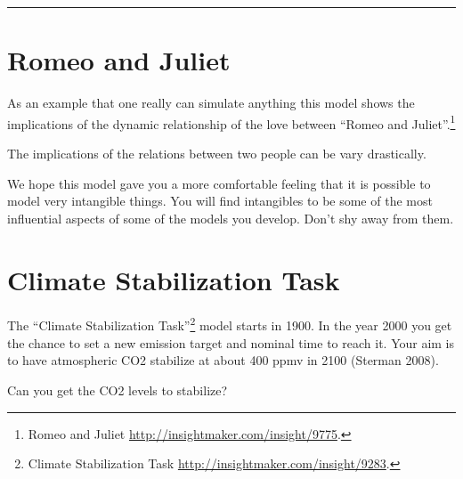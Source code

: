 \documentclass[]{memoir}
\begin{document}
\begin{center}\rule{3in}{0.4pt}\end{center}

\section{Romeo and Juliet}

As an example that one really can simulate anything this model shows the
implications of the dynamic relationship of the love between ``Romeo and
Juliet''.\footnote{Romeo and Juliet
  \url{http://insightmaker.com/insight/9775}.}

\FloatBarrier 

\begin{model}[frametitle={Model: Romeo and Juliet}] 

 The implications of the relations between two people can be vary drastically.




 \end{model}

We hope this model gave you a more comfortable feeling that it is
possible to model very intangible things. You will find intangibles to
be some of the most influential aspects of some of the models you
develop. Don't shy away from them.

\section{Climate Stabilization Task}

The ``Climate Stabilization Task''\footnote{Climate Stabilization Task
  \url{http://insightmaker.com/insight/9283}.} model starts in 1900. In
the year 2000 you get the chance to set a new emission target and
nominal time to reach it. Your aim is to have atmospheric CO2 stabilize
at about 400 ppmv in 2100 (Sterman 2008).

\FloatBarrier 

\begin{model}[frametitle={Model: Climate Stabilization Task}] 

 Can you get the CO2 levels to stabilize?




 \end{model}

\end{document}
